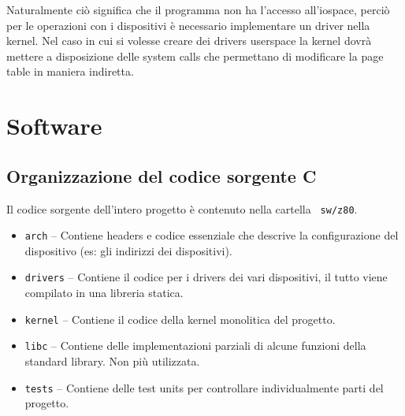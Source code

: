\documentclass[a4paper, 11pt]{article}
\begin{document}
Naturalmente ci\`o significa che il programma non ha l'accesso all'iospace,
perci\`o per le operazioni con i dispositivi \`e necessario implementare un
driver nella kernel. Nel caso in cui si volesse creare dei drivers userspace la
kernel dovr\`a mettere a disposizione delle system calls che permettano di
modificare la page table in maniera indiretta.

\break
\section{Software}
\subsection{Organizzazione del codice sorgente C}
Il codice sorgente dell'intero progetto \`e contenuto nella cartella {\tt
sw/z80}.
\begin{itemize}
    \item {\tt arch} -- Contiene headers e codice essenziale che descrive la
            configurazione del dispositivo (es: gli indirizzi dei dispositivi).
    \item {\tt drivers} -- Contiene il codice per i drivers dei vari 
            dispositivi, il tutto viene compilato in una libreria statica.
    \item {\tt kernel} -- Contiene il codice della kernel monolitica del progetto.
    \item {\tt libc} -- Contiene delle implementazioni parziali di alcune 
            funzioni della standard library. Non pi\`u utilizzata.
    \item {\tt tests} -- Contiene delle test units per controllare 
            individualmente parti del progetto.
\end{itemize}
\end{document}
